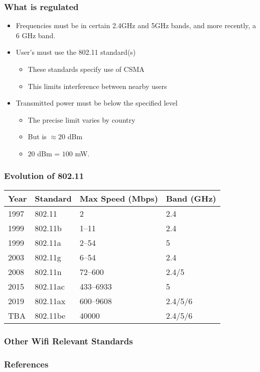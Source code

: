 \documentclass[18pt]{beamer}
\begin{document}
\begin{frame}\LARGE
\frametitle{What is regulated}
\begin{itemize}\Large
\item Frequencies must be in certain 2.4GHz and 5GHz bands, and more
recently, a 6 GHz band.
\item User's must use the 802.11 standard(s)
\begin{itemize}\large
\item These standards specify use of CSMA
\item This limits interference between nearby users
\end{itemize}
\item Transmitted power must be below the specified level
\begin{itemize}\large
\item The precise limit varies by country
\item But is $\approx 20$ dBm
\item $20$ dBm = $100$ mW.
\end{itemize}
\end{itemize}
\end{frame}

\begin{frame}\LARGE
\frametitle{Evolution of 802.11}
\large\centering
\begin{tabular}{|l|l|p{2cm}|p{2cm}|}
\hline
\bf Year&\bf Standard&\bf Max Speed (Mbps)&\bf Band (GHz)\\
\hline
1997&802.11&2 &2.4\\
1999&802.11b&1--11 &2.4\\
1999&802.11a&2--54 &5\\
2003&802.11g&6--54 &2.4\\
2008&802.11n&72--600 &2.4/5\\
2015&802.11ac&433--6933 &5\\
2019&802.11ax&600--9608 &2.4/5/6\\
TBA&802.11be&40000 &2.4/5/6\\
\hline
\end{tabular}
\end{frame}

\begin{frame}\LARGE
\frametitle{Other Wifi Relevant Standards}
%
\end{frame}

\begin{frame}\LARGE
\frametitle{References}
%


\end{frame}
\end{document}
